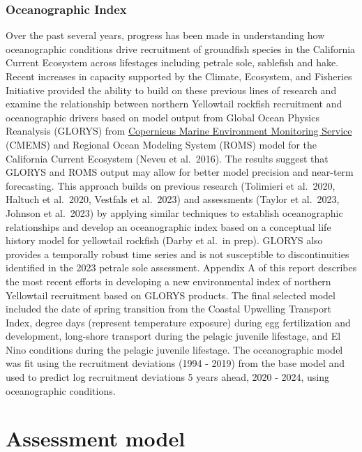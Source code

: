 \documentclass[
]{scrartcl}
\begin{document}
\hypertarget{oceanographic-index}{%
\subsubsection{Oceanographic Index}\label{oceanographic-index}}

Over the past several years, progress has been made in understanding how
oceanographic conditions drive recruitment of groundfish species in the
California Current Ecosystem across lifestages including petrale sole,
sablefish and hake. Recent increases in capacity supported by the
Climate, Ecosystem, and Fisheries Initiative provided the ability to
build on these previous lines of research and examine the relationship
between northern Yellowtail rockfish recruitment and oceanographic
drivers based on model output from Global Ocean Physics Reanalysis
(GLORYS) from \href{https://marine.copernicus.eu/}{Copernicus Marine
Environment Monitoring Service} (CMEMS) and Regional Ocean Modeling
System (ROMS) model for the California Current Ecosystem (Neveu et
al.~2016). The results suggest that GLORYS and ROMS output may allow for
better model precision and near-term forecasting. This approach builds
on previous research (Tolimieri et al.~2020, Haltuch et al.~2020,
Vestfals et al.~2023) and assessments (Taylor et al.~2023, Johnson et
al.~2023) by applying similar techniques to establish oceanographic
relationships and develop an oceanographic index based on a conceptual
life history model for yellowtail rockfish (Darby et al.~in prep).
GLORYS also provides a temporally robust time series and is not
susceptible to discontinuities identified in the 2023 petrale sole
assessment. Appendix A of this report describes the most recent efforts
in developing a new environmental index of northern Yellowtail
recruitment based on GLORYS products. The final selected model included
the date of spring transition from the Coastal Upwelling Transport
Index, degree days (represent temperature exposure) during egg
fertilization and development, long-shore transport during the pelagic
juvenile lifestage, and El Nino conditions during the pelagic juvenile
lifestage. The oceanographic model was fit using the recruitment
deviations (1994 - 2019) from the base model and used to predict log
recruitment deviations 5 years ahead, 2020 - 2024, using oceanographic
conditions.

\newpage{}

\hypertarget{assessment-model}{%
\section{Assessment model}\label{assessment-model}}
\end{document}
